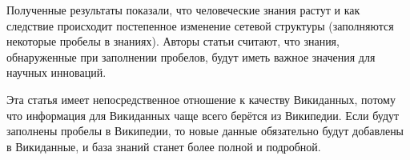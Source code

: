 Полученные результаты показали, что человеческие знания растут и как следствие происходит постепенное изменение сетевой структуры (заполняются некоторые пробелы в знаниях). Авторы статьи\autocite{Network_structure_revolutions} считают, что знания, обнаруженные при заполнении пробелов, будут иметь важное значения для научных инноваций. 

Эта статья\autocite{Network_structure_revolutions} имеет непосредственное отношение к качеству Викиданных, потому что информация для Викиданных чаще всего берётся из Википедии. Если будут заполнены пробелы в Википедии, то новые данные обязательно будут добавлены в Викиданные, и база знаний станет более полной и подробной.
